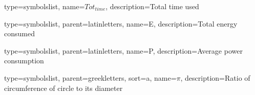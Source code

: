 


{
	type=symbolslist,
	name={\ensuremath{Tot_{time}}},
	description={Total time used}
}

{
	type=symbolslist,
	parent=latinletters,
	name=E,
	description={Total energy consumed}
}

{
	type=symbolslist,
	parent=latinletters,
	name=P,
	description={Average power consumption}
}

{
	type=symbolslist,
	parent=greekletters,
	sort=a,
	name={\ensuremath{\pi}},
	description={Ratio of circumference of circle to its diameter}
}





 

